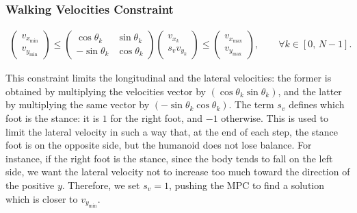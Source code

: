 \subsubsection{Walking Velocities Constraint}
\begin{align}
    \begin{pmatrix}
        v_{x_{\min}} \\[1ex]
        v_{y_{\min}}
    \end{pmatrix}
    \le
    \begin{pmatrix}
        \cos\theta_{k} & \sin\theta_{k} \\[1ex]
        -\sin\theta_{k} & \cos\theta_{k}
    \end{pmatrix}
    \begin{pmatrix}
        v_{x_{k}} \\[1ex]
        s_{v} v_{y_{k}}
    \end{pmatrix}
    \le
    \begin{pmatrix}
        v_{x_{\max}} \\[1ex]
        v_{y_{\max}}
    \end{pmatrix}
    , \qquad \forall k \in \left[ 0,\, N-1\right].
\end{align}

This constraint limits the longitudinal and the lateral velocities: the former is obtained by multiplying the velocities vector by $\left(\cos{\theta_k} \sin{\theta_k}\right)$, and the latter by multiplying the same vector by $\left(-\sin{\theta_k} \cos{\theta_k}\right)$.
The term $s_v$ defines which foot is the stance: it is $1$ for the right foot, and $-1$ otherwise. This is used to limit the lateral velocity in such a way that, at the end of each step, the stance foot is on the opposite side, but the humanoid does not lose balance.
For instance, if the right foot is the stance, since the body tends to fall on the left side, we want the lateral velocity not to increase too much toward the direction of the positive $y$. Therefore, we set $s_v=1$, pushing the MPC to find a solution which is closer to $v_{y_{\min}}$.

